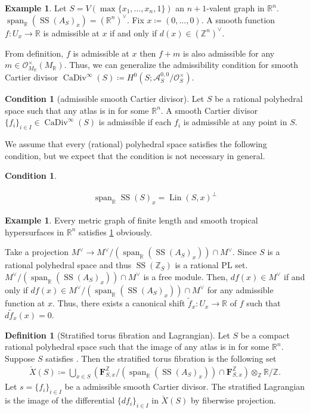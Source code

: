 \documentclass[a4paper,dvipdfmx,reqno,12pt]{amsart}
\theoremstyle{definition}
\newtheorem{Def}[Thm]{Definition}
\newtheorem{Eg}[Thm]{Example}
\newtheorem{Cond}[Thm]{Condition}
\newcommand{\deq}{\coloneqq}
\newcommand{\R}{\mathbb{R}}%
\newcommand{\Z}{\mathbb{Z}}%
\newcommand{\mcal}[1]{\mathcal{#1}}%
\newcommand{\opn}[1]{\operatorname{#1}}
\numberwithin{equation}{section}
\begin{document}
\begin{Eg}
Let $S=V(\max\{x_1,\ldots,x_n,1\})$ an $n+1$-valent graph in $\R^{n}$.
$\opn{span}_{\R}(\opn{SS}(A_S)_x)=(\R^{n})^{\vee}$.
Fix $x\deq (0,\ldots,0)$.
A smooth function $f\colon U_x\to \R$ is admissible at $x$
if and only if $d(x)\in (\Z^{n})^{\vee}$.
\end{Eg}


From definition, $f$ is admissible at $x$ then $f+m$ is also admissible for 
any $m\in \mcal{O}^{\times}_{M_{\R}}(M_{\R})$.  
Thus, we can generalize the admissibility condition for
smooth Cartier divisor $\opn{CaDiv}^{\infty}(S)\deq H^{0}(S;\mcal{A}^{0,0}_S/\mcal{O}^{\times}_S)$.
\begin{Cond}[{admissible smooth Cartier divisor}]
Let $S$ be a rational polyhedral space such that any atlas is 
in for some $\R^{n}$. A smooth Cartier divisor 
$\{f_i\}_{i\in I}\in \opn{CaDiv}^{\infty}(S)$ is admissible 
if each $f_i$ is admissible at any point in $S$.
\end{Cond}

We assume that every (rational) polyhedral space satisfies 
the following condition,
but we expect that the condition is not necessary
in general.

\begin{Cond} \label{cond: good}

\begin{align}
\opn{span}_{\R}\opn{SS}(S)_x=\opn{Lin}(S,x)^{\bot}
\end{align}
\end{Cond}

\begin{Eg}
Every metric graph of finite length and 
smooth tropical hypersurfaces in $\R^{n}$ satisfies
\cref{cond: good} obviously.
\end{Eg}

Take a projection $M^{\vee}\to 
M^{\vee}/(\opn{span}_{\R}(\opn{SS}(A_S)_x))\cap M^{\vee}$.
Since $S$ is a rational polyhedral space and thus 
$\opn{SS}(\Z_S)$ is a rational PL set. 
$M^{\vee}/(\opn{span}_{\R}(\opn{SS}(A_S)_x))\cap M^{\vee}$
is a free module. 
Then, $df(x)\in M^{\vee}$ if and only if 
$df(x)\in M^{\vee}/(\opn{span}_{\R}(\opn{SS}(A_S)_x))\cap M^{\vee}$
for any admissible function at $x$. Thus, there exists a canonical
shift $\tilde{f}_x\colon U_x\to \R$ of $f$ such that
$d\tilde{f}_x(x)=0$.

\begin{Def}[{Stratified torus fibration and Lagrangian}]
Let $S$ be a compact rational polyhedral space such that 
the image of any atlas is 
in for some $\R^{n}$. 
Suppose $S$ satisfies \label{cond: good}.
Then the stratified torus 
fibration is the following set
\begin{align}
\check{X}(S)\deq \bigcup_{x\in S} 
(\mathbf{F}_{S,x}^{\Z}/(\opn{span}_{\R}
(\opn{SS}(A_S)_x))\cap \mathbf{F}_{S,x}^{\Z})\otimes_{\Z} \R/\Z.
\end{align}
Let $s=\{f_i\}_{i\in I}$ be a admissible smooth Cartier divisor. 
The stratified Lagrangian is the image of the differential  $\{df_i\}_{i\in I}$ in $\check{X}(S)$
by fiberwise projection.
\end{Def}
\end{document}
